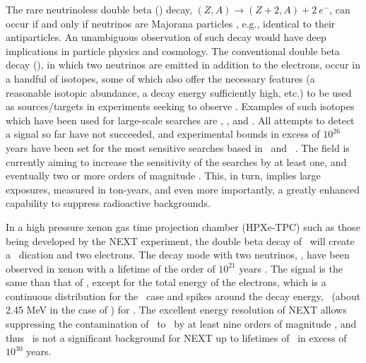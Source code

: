 \documentclass[aps,prl,reprint,longbibliography,superscriptaddress, english]{revtex4-1}
\begin{document}
The rare neutrinoless double beta  (\bbonu) decay, $(Z,A) \rightarrow (Z+2,A) + 2\ e^{-}$, can occur if and only if neutrinos are Majorana particles \cite{Majorana:1937}, e.g., identical to their antiparticles. An unambiguous observation of such decay would have deep implications in particle physics and cosmology\cite{Sakharov1967,Fukugita:1986hr, GellMann:1980vs, Yanagida:1979as, Mohapatra:1979ia}. 
The conventional double beta decay (\bbtnu), in which two neutrinos are emitted in addition to the electrons, occur in a handful of isotopes, some of which also offer the necessary features (a reasonable isotopic abundance, a decay energy sufficiently high, etc.) to be used as sources/targets in experiments seeking to observe \bbonu. Examples of such isotopes which have been used for large-scale searches are \GE, \TE, and \XE. All attempts to detect a signal so far have not succeeded, and experimental bounds in excess of $10^{26}$ years have been set for the most sensitive searches based in \XE\ and \GE\ \cite{Gando:2016ji, Agostini:2018tnm}.
The field is currently aiming to increase the sensitivity of the searches by at least one, and eventually two or more orders of magnitude \cite{Gomez-Cadenas:2019sfa}. This, in turn, implies large exposures, measured in ton-years, and even more importantly, a greatly enhanced capability to suppress radioactive backgrounds. 

In a high pressure xenon gas time projection chamber (HPXe-TPC) such as those being developed by the NEXT experiment, the double beta decay of \XE\ will create a \Bapp\ dication and two electrons.
%
The decay mode with two neutrinos, \bbtnu, have been observed in xenon with a lifetime of the order of $10^{21}$ years \cite{Ackerman:2011gz}. The  signal is the same than that of \bbonu, except for the total energy of the electrons, which is a continuous distribution for the \bbtnu\ case and spikes around the decay energy, \Qbb\ (about 2.45 MeV in the case of \XE) for \bbonu. The excellent energy resolution of NEXT allows suppressing the contamination of \bbtnu\ to \bbonu\ by at least nine orders of magnitude \cite{rivilla_fluorescent_2020}, and thus \bbtnu\ is not a significant background for NEXT up to lifetimes of \bbonu\ in excess of $10^{30}$ years. 
\end{document}
